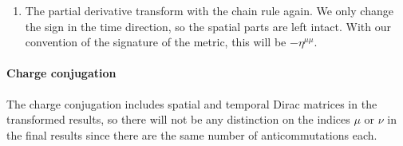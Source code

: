 \documentclass[11pt, english, fleqn, DIV=15, headinclude, BCOR=1cm]{scrartcl}
\begin{document}
\begin{enumerate}
\begin{align*}
{\[                    \begin{pmatrix}
                        & 1+2+0=4 & 2+2+1=6 & 2+1+0=4 \\
                        & & 1+2+1=5 & 1+1+0=3 \\
                        & & & 2+1+1=5
                    \end{pmatrix}.
                \]
                This can be summed up in
            }
            &= - \eta^{\mu\mu} \eta^{\nu\nu} \bar\psi \mat\gamma^1
            \mat\gamma^3 \mat\gamma^3 \mat\gamma^1 \gamma^{\mu\nu} \psi.
            \intertext{%
                Now we can remove the pairs of Dirac matrices. Each pair will
                give a minus sign, so the total sign does not change.
            }
            &= - \eta^{\mu\mu} \eta^{\nu\nu} \bar\psi \psi
        \end{align*}

    \item
        The partial derivative transform with the chain rule again. We only
        change the sign in the time direction, so the spatial parts are left
        intact. With our convention of the signature of the metric, this will
        be $- \eta^{\mu\mu}$.
\end{enumerate}

\paragraph{Charge conjugation}

The charge conjugation includes spatial and temporal Dirac matrices in the
transformed results, so there will not be any distinction on the indices $\mu$
or $\nu$ in the final results since there are the same number of
anticommutations each.
\end{document}
